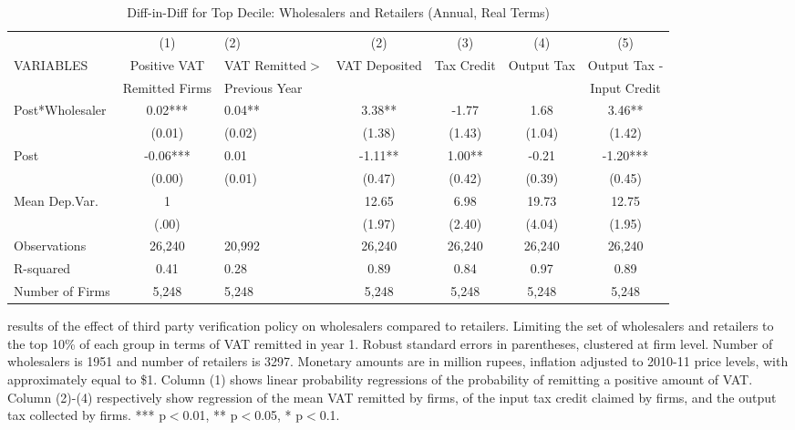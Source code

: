 \begin{table}[h]
\footnotesize
\begin{threeparttable}
\caption{Diff-in-Diff for Top Decile: Wholesalers and Retailers (Annual, Real Terms)}
\begin{tabular}{lcHcccc} \hline \hline
  & (1) & (2) & (2) & (3) & (4) & (5) \\
 VARIABLES & Positive VAT  & VAT Remitted$>$ & VAT Deposited & Tax Credit & Output Tax & Output Tax -\\
 & Remitted Firms & Previous Year &  &  & & Input Credit \\ \hline
 Post*Wholesaler & 0.02*** & 0.04** & 3.38** & -1.77 & 1.68 & 3.46** \\
 & (0.01) & (0.02) & (1.38) & (1.43) & (1.04) & (1.42) \\
Post & -0.06*** & 0.01 & -1.11** & 1.00** & -0.21 & -1.20*** \\
 & (0.00) & (0.01) & (0.47) & (0.42) & (0.39) & (0.45) \\ \hline
Mean Dep.Var. &1 & & 12.65 & 6.98 & 19.73& 12.75  \\
&(.00)&&(1.97)&(2.40)& (4.04)&(1.95) \\ \hline
Observations & 26,240 & 20,992 & 26,240 & 26,240 & 26,240 & 26,240 \\
R-squared & 0.41 & 0.28 & 0.89 & 0.84 & 0.97 & 0.89 \\
Number of Firms & 5,248 & 5,248 & 5,248 & 5,248 & 5,248 & 5,248 \\ \hline \hline
\end{tabular}
\begin{tablenotes}
 results of the effect of third party verification policy on wholesalers compared to retailers. Limiting the set of wholesalers and retailers to the top 10\% of each group in terms of VAT remitted in year 1. Robust standard errors in parentheses, clustered at firm level. Number of wholesalers is 1951 and number of retailers is 3297. Monetary amounts are in million rupees, inflation adjusted to 2010-11 price levels, with  approximately equal to \$1. Column (1) shows linear probability regressions of the probability of remitting a positive amount of VAT. Column (2)-(4) respectively show regression of the mean VAT remitted by firms, of the input tax credit claimed by firms, and the output tax collected by firms. *** p$<$0.01, ** p$<$0.05, * p$<$0.1.
\end{tablenotes}
\label{tbl:group1-decile}
\end{threeparttable}
\end{table}

